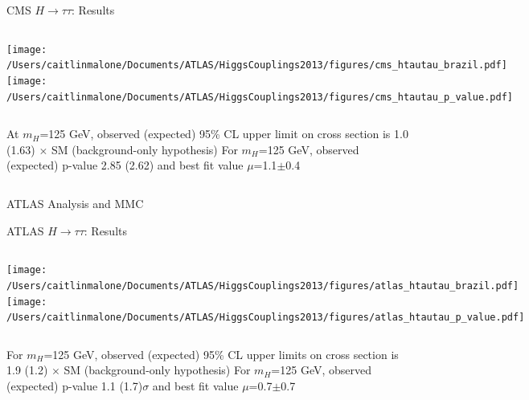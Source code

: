 \documentclass{beamer}
\begin{document}
\begin{frame}{CMS $H\rightarrow \tau \tau$: Results}
	\begin{columns}[c]
			\texttt{[image: /Users/caitlinmalone/Documents/ATLAS/HiggsCouplings2013/figures/cms\_htautau\_brazil.pdf]}\\
			\texttt{[image: /Users/caitlinmalone/Documents/ATLAS/HiggsCouplings2013/figures/cms\_htautau\_p\_value.pdf]}\\
	\end{columns}	
	\vspace{0.5cm}
	\begin{columns}
			\scriptsize 
			At $m_H$=125 GeV, observed (expected) 95\% CL upper limit on cross section is 1.0 (1.63) $\times$ SM (background-only hypothesis)
			\scriptsize
			For $m_H$=125 GeV, observed (expected) p-value 2.85 (2.62) and best fit value $\mu$=1.1$\pm$0.4 
	\end{columns}	

\end{frame}



\begin{frame}{ATLAS Analysis and MMC}

\end{frame}






\begin{frame}{ATLAS $H\rightarrow\tau\tau$: Results}
	\begin{columns}[c]
		\column{0.5\textwidth}
			\texttt{[image: /Users/caitlinmalone/Documents/ATLAS/HiggsCouplings2013/figures/atlas\_htautau\_brazil.pdf]}
		\column{0.5\textwidth}
			\texttt{[image: /Users/caitlinmalone/Documents/ATLAS/HiggsCouplings2013/figures/atlas\_htautau\_p\_value.pdf]}
	\end{columns}
	
	\begin{columns}[c]
			\scriptsize
			For $m_H$=125 GeV, observed (expected) 95\% CL upper limits on cross section is 1.9 (1.2) $\times$ SM (background-only hypothesis)
			\scriptsize
			For $m_H$=125 GeV, observed (expected) p-value 1.1 (1.7)$\sigma$ and best fit value $\mu$=0.7$\pm$0.7
	\end{columns}
\end{frame}
\end{document}
